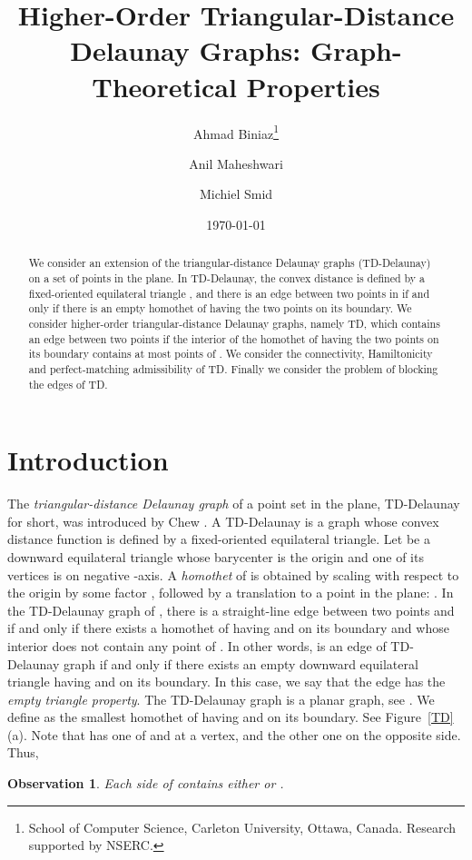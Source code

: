 \documentclass[11pt,a4paper]{article}
\title{Higher-Order Triangular-Distance Delaunay Graphs: Graph-Theoretical Properties}
\author{
Ahmad Biniaz\thanks{School of Computer Science, Carleton University, 
                    Ottawa, Canada. Research supported by NSERC.}
\and 
Anil Maheshwari\footnotemark[1]
\and 
Michiel Smid\footnotemark[1]
}
\date{\today}
\newcommand{\kTD}[2]{\text{-}TD#2}
\newtheorem{observation}{Observation}
\begin{document}
\maketitle

\begin{abstract}
We consider an extension of the triangular-distance Delaunay graphs (TD-Delaunay) on a set  of points in the plane. In TD-Delaunay, the convex distance is defined by a fixed-oriented equilateral triangle , and there is an edge between two points in  if and only if there is an empty homothet of  having the two points on its boundary. We consider higher-order triangular-distance Delaunay graphs, namely \kTD{k}{}, which contains an edge between two points if the interior of the homothet of  having the two points on its boundary contains at most  points of . We consider the connectivity, Hamiltonicity and perfect-matching admissibility of \kTD{k}{}. Finally we consider the problem of blocking the edges of \kTD{k}{}.
\end{abstract}

\section{Introduction}
The {\em triangular-distance Delaunay graph} of a point set  in the plane, TD-Delaunay for short, was introduced by Chew \cite{Chew1989}. A TD-Delaunay is a graph whose convex distance function is defined by a fixed-oriented equilateral triangle. Let  be a downward equilateral triangle whose barycenter
is the origin and one of its vertices is on negative -axis. A {\em homothet} of  is obtained by scaling  with respect to the origin by some factor , followed by a translation to a point  in the plane: .
In the TD-Delaunay graph of , there is a straight-line edge between two points  and  if and only if there exists a homothet of  having  and  on its boundary and whose interior does not contain any point of . In other words,  is an edge of TD-Delaunay graph if and only if there exists an empty downward equilateral triangle having  and  on its boundary. In this case, we say that the edge  has the {\em empty triangle property}. 
The TD-Delaunay graph is a planar graph, see \cite{Bose2010}.
We define  as the smallest homothet of  having  and  on its boundary. See Figure~\ref{TD}(a). Note that  has one of  and  at a vertex, and the other one on the opposite side. Thus,

\begin{observation}
\label{side-point-obs}
 Each side of  contains either  or .
\end{observation}
\end{document}
